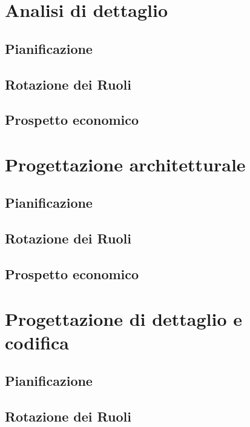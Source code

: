 \documentclass[12pt,a4paper]{article}
\begin{document}
\newpage
\section{Analisi di dettaglio} %

\subsection{Pianificazione}

\subsection{Rotazione dei Ruoli}

\subsection{Prospetto economico}

\newpage
\section{Progettazione architetturale} %

\subsection{Pianificazione}

\subsection{Rotazione dei Ruoli}

\subsection{Prospetto economico}

\newpage
\section{Progettazione di dettaglio e codifica} %

\subsection{Pianificazione}

\subsection{Rotazione dei Ruoli}
\end{document}
